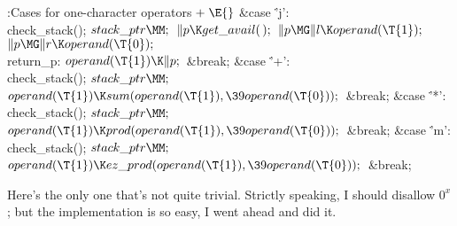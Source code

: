 \Y\B\4:Cases for one-character operators\X${}\mathrel+\E{}$\6
\4\&{case} \.{'j'}:\5
\\{check\_stack}();\6
${}\\{stack\_ptr}\MM;{}$\6
${}\|p\K\\{get\_avail}(\,);{}$\6
${}\|p\MG\|l\K\\{operand}(\T{1});{}$\6
${}\|p\MG\|r\K\\{operand}(\T{0});{}$\6
\4\\{return\_p}:\5
${}\\{operand}(\T{1})\K\|p;{}$\6
\&{break};\6
\4\&{case} \.{'+'}:\5
\\{check\_stack}();\6
${}\\{stack\_ptr}\MM;{}$\6
${}\\{operand}(\T{1})\K\\{sum}(\\{operand}(\T{1}),\39\\{operand}(\T{0}));{}$\6
\&{break};\6
\4\&{case} \.{'*'}:\5
\\{check\_stack}();\6
${}\\{stack\_ptr}\MM;{}$\6
${}\\{operand}(\T{1})\K\\{prod}(\\{operand}(\T{1}),\39\\{operand}(\T{0}));{}$\6
\&{break};\6
\4\&{case} \.{'m'}:\5
\\{check\_stack}();\6
${}\\{stack\_ptr}\MM;{}$\6
${}\\{operand}(\T{1})\K\\{ez\_prod}(\\{operand}(\T{1}),\39\\{operand}(%
\T{0}));{}$\6
\&{break};\par
\fi

Here's the only one that's not quite trivial. Strictly speaking, I
should disallow $0^x$; but the implementation is so easy, I went ahead
and did it.

